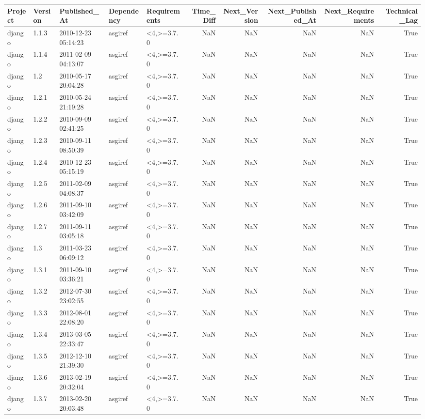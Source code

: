 \begin{tabular}{lllllrrrrr}
\toprule
Project & Version & Published_At & Dependency & Requirements & Time_Diff & Next_Version & Next_Published_At & Next_Requirements & Technical_Lag \\
\midrule
django & 1.1.3 & 2010-12-23 05:14:23 & asgiref & <4,>=3.7.0 & NaN & NaN & NaN & NaN & True \\
django & 1.1.4 & 2011-02-09 04:13:07 & asgiref & <4,>=3.7.0 & NaN & NaN & NaN & NaN & True \\
django & 1.2 & 2010-05-17 20:04:28 & asgiref & <4,>=3.7.0 & NaN & NaN & NaN & NaN & True \\
django & 1.2.1 & 2010-05-24 21:19:28 & asgiref & <4,>=3.7.0 & NaN & NaN & NaN & NaN & True \\
django & 1.2.2 & 2010-09-09 02:41:25 & asgiref & <4,>=3.7.0 & NaN & NaN & NaN & NaN & True \\
django & 1.2.3 & 2010-09-11 08:50:39 & asgiref & <4,>=3.7.0 & NaN & NaN & NaN & NaN & True \\
django & 1.2.4 & 2010-12-23 05:15:19 & asgiref & <4,>=3.7.0 & NaN & NaN & NaN & NaN & True \\
django & 1.2.5 & 2011-02-09 04:08:37 & asgiref & <4,>=3.7.0 & NaN & NaN & NaN & NaN & True \\
django & 1.2.6 & 2011-09-10 03:42:09 & asgiref & <4,>=3.7.0 & NaN & NaN & NaN & NaN & True \\
django & 1.2.7 & 2011-09-11 03:05:18 & asgiref & <4,>=3.7.0 & NaN & NaN & NaN & NaN & True \\
django & 1.3 & 2011-03-23 06:09:12 & asgiref & <4,>=3.7.0 & NaN & NaN & NaN & NaN & True \\
django & 1.3.1 & 2011-09-10 03:36:21 & asgiref & <4,>=3.7.0 & NaN & NaN & NaN & NaN & True \\
django & 1.3.2 & 2012-07-30 23:02:55 & asgiref & <4,>=3.7.0 & NaN & NaN & NaN & NaN & True \\
django & 1.3.3 & 2012-08-01 22:08:20 & asgiref & <4,>=3.7.0 & NaN & NaN & NaN & NaN & True \\
django & 1.3.4 & 2013-03-05 22:33:47 & asgiref & <4,>=3.7.0 & NaN & NaN & NaN & NaN & True \\
django & 1.3.5 & 2012-12-10 21:39:30 & asgiref & <4,>=3.7.0 & NaN & NaN & NaN & NaN & True \\
django & 1.3.6 & 2013-02-19 20:32:04 & asgiref & <4,>=3.7.0 & NaN & NaN & NaN & NaN & True \\
django & 1.3.7 & 2013-02-20 20:03:48 & asgiref & <4,>=3.7.0 & NaN & NaN & NaN & NaN & True \\

\end{tabular}
